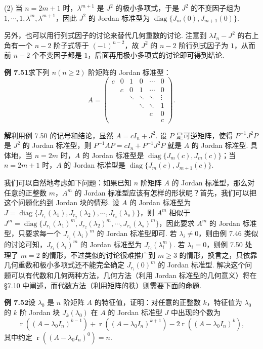 \documentclass[UTF8,12pt,a4paper,fontset=fandol]{ctexart}
\begin{document}
(2) 当 $n=2m+1$ 时，$\lambda^{m+1}$ 是 $J^2$ 的极小多项式，于是 $J^2$ 的不变因子组为 $1,\cdots,1,\lambda^m,\lambda^{m+1}$，因此 $J^2$ 的 Jordan 标准型为 $\operatorname{diag}\{J_m(0),J_{m+1}(0)\}$.

另外，也可以用行列式因子的讨论来替代几何重数的讨论. 注意到 $\lambda I_n-J^2$ 的右上角有一个 $n-2$ 阶子式等于 $(-1)^{n-2}$，故 $J^2$ 的 $n-2$ 阶行列式因子为 $1$，从而前 $n-2$ 个不变因子都是 $1$，后面再用极小多项式的讨论即可得到结论.

\noindent\textbf{例 7.51}\quad 求下列 $n(n\ge 2)$ 阶矩阵的 Jordan 标准型：
\[
A=\left(\begin{array}{cccccc}
c & 0 & 1 & 0 & \cdots & 0\\
  & c & 0 & 1 & \cdots & 0\\
  &   & \ddots & \ddots & \ddots & \vdots\\
  &   &        & \ddots & \ddots & 1\\
  &   &        &        & c & 0\\
  &   &        &        &   & c
\end{array}\right).
\]

\noindent\textbf{解}\quad 利用例 7.50 的记号和结论，显然 $A=cI_n+J^2$. 设 $P$ 是可逆矩阵，使得 $P^{-1}J^2P$ 是 $J^2$ 的 Jordan 标准型，则 $P^{-1}AP=cI_n+P^{-1}J^2P$ 就是 $A$ 的 Jordan 标准型. 具体地，当 $n=2m$ 时，$A$ 的 Jordan 标准型是 $\operatorname{diag}\{J_m(c),J_m(c)\}$；当 $n=2m+1$ 时，$A$ 的 Jordan 标准型是 $\operatorname{diag}\{J_m(c),J_{m+1}(c)\}$.

我们可以自然地考虑如下问题：如果已知 $n$ 阶矩阵 $A$ 的 Jordan 标准型，那么对任意的正整数 $m$，$A^m$ 的 Jordan 标准型应该有怎样的形状呢？首先，我们可以把这个问题化约到 Jordan 块的情形. 设 $A$ 的 Jordan 标准型为 $J=\operatorname{diag}\{J_{r_1}(\lambda_1),J_{r_2}(\lambda_2),\cdots,J_{r_s}(\lambda_s)\}$，则 $A^m$ 相似于 $J^m=\operatorname{diag}\{J_{r_1}(\lambda_1)^m,J_{r_2}(\lambda_2)^m,\cdots,J_{r_s}(\lambda_s)^m\}$，因此要求 $A^m$ 的 Jordan 标准型，只要求每一个 $J_{r_i}(\lambda_i)^m$ 的 Jordan 标准型即可. 若 $\lambda_i\ne 0$，则由例 7.46 类似的讨论可知，$J_{r_i}(\lambda_i)^m$ 的 Jordan 标准型为 $J_{r_i}(\lambda_i^m)$. 若 $\lambda_i=0$，则例 7.50 处理了 $m=2$ 的情形，不过类似的讨论很难推广到 $m\ge 3$ 的情形，换言之，只依靠几何重数和极小多项式还不能完全确定 $J_{r_i}(0)^m$ 的 Jordan 标准型. 解决这个问题可以有代数和几何两种方法，几何方法（利用 Jordan 标准型的几何意义）将在 §7.10 中阐述，而代数方法（利用矩阵的秩）则需要下面的命题.

\noindent\textbf{例 7.52}\quad 设 $\lambda_0$ 是 $n$ 阶矩阵 $A$ 的特征值，证明：对任意的正整数 $k$，特征值为 $\lambda_0$ 的 $k$ 阶 Jordan 块 $J_k(\lambda_0)$ 在 $A$ 的 Jordan 标准型 $J$ 中出现的个数为
\[
\operatorname{r}((A-\lambda_0I_n)^{k-1})+\operatorname{r}((A-\lambda_0I_n)^{k+1})-2\operatorname{r}((A-\lambda_0I_n)^k),
\]
其中约定 $\operatorname{r}((A-\lambda_0I_n)^0)=n$.
\end{document}
